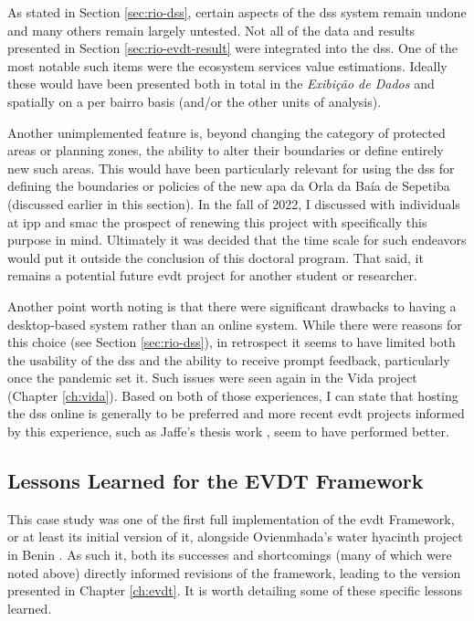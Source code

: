 As stated in Section \ref{sec:rio-dss}, certain aspects of the \ac{dss} system remain undone and many others remain largely untested. Not all of the data and results presented in Section \ref{sec:rio-evdt-result} were integrated into the \ac{dss}. One of the most notable such items were the ecosystem services value estimations. Ideally these would have been presented both in total in the \textit{Exibição de Dados} and spatially on a per bairro basis (and/or the other units of analysis).

Another unimplemented feature is, beyond changing the category of protected areas or planning zones, the ability to alter their boundaries or define entirely new such areas. This would have been particularly relevant for using the \ac{dss} for defining the boundaries or policies of the new \ac{apa} da Orla da Baía de Sepetiba (discussed earlier in this section). In the fall of 2022, I discussed with individuals at \ac{ipp} and \ac{smac} the prospect of renewing this project with specifically this purpose in mind. Ultimately it was decided that the time scale for such endeavors would put it outside the conclusion of this doctoral program. That said, it remains a potential future \ac{evdt} project for another student or researcher. 

Another point worth noting is that there were significant drawbacks to having a desktop-based system rather than an online system. While there were reasons for this choice (see Section \ref{sec:rio-dss}), in retrospect it seems to have limited both the usability of the \ac{dss} and the ability to receive prompt feedback, particularly once the pandemic set it. Such issues were seen again in the Vida project (Chapter \ref{ch:vida}). Based on both of those experiences, I can state that hosting the \ac{dss} online is generally to be preferred and more recent \ac{evdt} projects informed by this experience, such as Jaffe's thesis work \cite{jaffeEnvironmentalEconomicSystems2022}, seem to have performed better.  

\subsection{Lessons Learned for the EVDT Framework} \label{sec:rio-lessons-learned}

This case study was one of the first full implementation of the \ac{evdt} Framework, or at least its initial version of it, alongside Ovienmhada's water hyacinth project in Benin \cite{ovienmhadaInclusiveDesignEarth2021}. As such it, both its successes and shortcomings (many of which were noted above) directly informed revisions of the framework, leading to the version presented in Chapter \ref{ch:evdt}. It is worth detailing some of these specific lessons learned.

